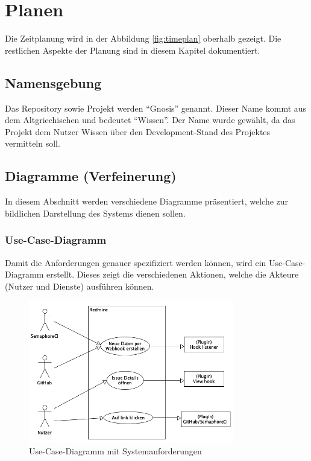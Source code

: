 \chapter{Planen}
\label{chap:plan}
Die Zeitplanung wird in der Abbildung \ref{fig:timeplan} oberhalb gezeigt. Die restlichen Aspekte der Planung sind in diesem Kapitel dokumentiert.

\section{Namensgebung}
Das Repository sowie Projekt werden \enquote{Gnosis} genannt. Dieser Name kommt aus dem Altgriechischen und bedeutet
\enquote{Wissen}. Der Name wurde gewählt, da das Projekt dem Nutzer Wissen über den Development-Stand des Projektes
vermitteln soll. 

\section{Diagramme (Verfeinerung)}
In diesem Abschnitt werden verschiedene Diagramme präsentiert, welche zur bildlichen Darstellung des Systems dienen sollen.
\subsection{Use-Case-Diagramm}
Damit die Anforderungen genauer spezifiziert werden können, wird ein Use-Case-Diagramm erstellt. Dieses zeigt die verschiedenen
Aktionen, welche die Akteure (Nutzer und Dienste) ausführen können.
\begin{figure}[H]
  \centering
  \includegraphics[width=0.8\textwidth]{images/use-case/base.png}
  \caption[Ein Use-Case-Diagramm, welches die verschiedenen Systemanforderungen aufzeigt]{Use-Case-Diagramm mit Systemanforderungen}
  \label{fig:use_case}
\end{figure}
